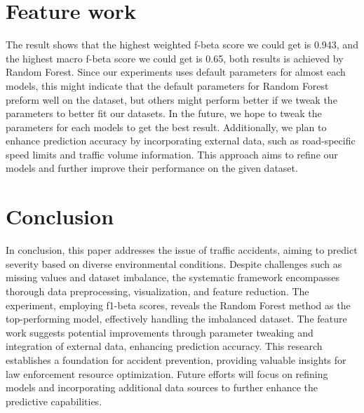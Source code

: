 \documentclass[10pt,twocolumn,letterpaper]{article}
\begin{document}
\begin{CJK}{UTF8}{bsmi}
\section{Feature work}
The result shows that the highest weighted f-beta score we could get is 0.943, and the highest macro f-beta score we could get is 0.65, both results is achieved by Random Forest. Since our experiments uses default parameters for almost each models, this might indicate that the default parameters for Random Forest preform well on the dataset, but others might perform better if we tweak the parameters to better fit our datasets. In the future, we hope to tweak the parameters for each models to get the best result. Additionally, we plan to enhance prediction accuracy by incorporating external data, such as road-specific speed limits and traffic volume information. This approach aims to refine our models and further improve their performance on the given dataset.

\section{Conclusion}
In conclusion, this paper addresses the issue of traffic accidents, aiming to predict severity based on diverse environmental conditions. Despite challenges such as missing values and dataset imbalance, the systematic framework encompasses thorough data preprocessing, visualization, and feature reduction. The experiment, employing f1-beta scores, reveals the Random Forest method as the top-performing model, effectively handling the imbalanced dataset. The feature work suggests potential improvements through parameter tweaking and integration of external data, enhancing prediction accuracy. This research establishes a foundation for accident prevention, providing valuable insights for law enforcement resource optimization. Future efforts will focus on refining models and incorporating additional data sources to further enhance the predictive capabilities.

{\small


}

\end{CJK}
\end{document}
